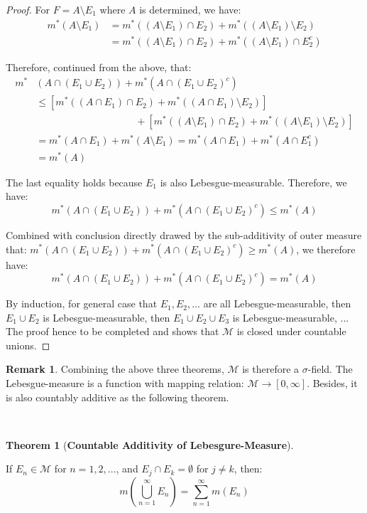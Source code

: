 \documentclass[reqno]{amsart}
\theoremstyle{definition}
\newtheorem{theorem}{Theorem}
\newtheorem{remark}{Remark}{\normalfont}
\begin{document}
\begin{proof}
For $F = A \setminus E_{1}$ where $A$ is determined, we have:
\begin{align*}
m^{*}(A \setminus E_{1}) & = m^{*}\left((A \setminus E_{1}) \cap E_{2}\right) + m^{*}\left((A \setminus E_{1}) \setminus E_{2}\right)\\
& = m^{*}\left((A \setminus E_{1}) \cap E_{2}\right) + m^{*}\left((A \setminus E_{1}) \cap E^{c}_{2}\right)
\end{align*}

Therefore, continued from the above, that:
\begin{align*}
m^{*} & \left(A \cap (E_{1} \cup E_{2})\right) + m^{*}\left( A \cap (E_{1} \cup E_{2})^{c} \right)\\
& \leq \left[ m^{*}\left((A \cap E_{1}) \cap E_{2}\right) + m^{*}\left((A \cap E_{1}) \setminus E_{2} \right)\right]\\
& \qquad \qquad \qquad \qquad \qquad + \left[ m^{*}\left((A \setminus E_{1}) \cap E_{2}\right) + m^{*}\left((A \setminus E_{1}) \setminus E_{2} \right)\right]\\
& = m^{*}\left(A \cap E_{1} \right) + m^{*}\left(A \setminus E_{1} \right) = m^{*}\left(A \cap E_{1} \right) + m^{*}\left(A \cap E^{c}_{1} \right)\\
& = m^{*}\left( A \right)
\end{align*}

The last equality holds because $E_{1}$ is also Lebesgue-measurable. Therefore, we have: 
$$
m^{*} \left(A \cap (E_{1} \cup E_{2})\right) + m^{*}\left( A \cap (E_{1} \cup E_{2})^{c} \right) \leq m^{*}\left( A \right)
$$

Combined with conclusion directly drawed by the sub-additivity of outer measure that: $ m^{*} \left(A \cap (E_{1} \cup E_{2})\right) + m^{*}\left( A \cap (E_{1} \cup E_{2})^{c} \right) \geq m^{*}\left( A \right)$, we therefore have: 
$$
m^{*} \left(A \cap (E_{1} \cup E_{2})\right) + m^{*}\left( A \cap (E_{1} \cup E_{2})^{c} \right) = m^{*}\left( A \right)
$$

By induction, for general case that $E_{1}, E_{2}, ...$ are all Lebesgue-measurable, then $E_{1} \cup E_{2}$ is Lebesgue-measurable, then $E_{1} \cup E_{2} \cup E_{3}$ is Lebesgue-measurable, ... The proof hence to be completed and shows that $\mathcal{M}$ is closed under countable unions.
\end{proof}

\begin{remark}{\mbox{}}
Combining the above three theorems, $\mathcal{M}$ is therefore a $\sigma$-field. The Lebesgue-measure is a function with mapping relation: $\mathcal{M} \rightarrow [0, \infty]$. Besides, it is also countably additive as the following theorem.
\end{remark}
~\\
\begin{theorem}[\textbf{Countable Additivity of Lebesgure-Measure}]
~\

If $E_{n} \in \mathcal{M}$ for $n = 1, 2 ,...$, and $E_{j} \cap E_{k} = \emptyset$ for $j \neq k$, then:
$$
m\left( \bigcup\limits^{\infty}_{n=1}E_{n} \right) = \sum\limits^{\infty}_{n=1}m\left( E_{n} \right)
$$
\end{theorem}
\end{document}
